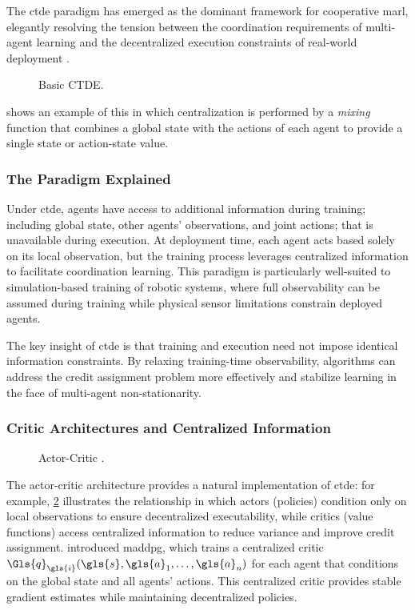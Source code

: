The \gls{ctde} paradigm has emerged as the dominant framework for cooperative \gls{marl}, 
elegantly resolving the tension between the coordination requirements of multi-agent 
learning and the decentralized execution constraints of real-world deployment 
\cite{lowe2020, foerster2018}.

\begin{figure}[!ht]
    \centering
    
    \caption{Basic CTDE.}
    \label{fig:basic_ctde}
\end{figure}
 shows an example of this in which centralization is
performed by a \emph{mixing} function that combines a global state with 
the actions of each agent to provide a single state or action-state value.

\subsubsection{The Paradigm Explained}

Under \gls{ctde}, agents have access to additional information during training;
including global state, other agents' observations, and joint actions;
that is unavailable during execution. At deployment time, 
each agent acts based solely on its local observation, 
but the training process leverages centralized information to 
facilitate coordination learning. This paradigm is particularly well-suited 
to simulation-based training of robotic systems, 
where full observability can be assumed during training while physical 
sensor limitations constrain deployed agents.

The key insight of \gls{ctde} is that training and execution need not 
impose identical information constraints. By relaxing training-time observability, 
algorithms can address the credit assignment problem more effectively and 
stabilize learning in the face of multi-agent non-stationarity.

\subsubsection{Critic Architectures and Centralized Information}

\begin{figure}
    \centering
    
    \caption{Actor-Critic .}
    \label{fig:ctde_actor-critic}
\end{figure}

The actor-critic architecture provides a natural implementation of \gls{ctde}: 
for example, \cref{fig:ctde_actor-critic} illustrates the relationship in which
actors (policies) condition only on local observations to ensure decentralized 
executability, while critics (value functions) access centralized information 
to reduce variance and improve credit assignment. 
\cite{lowe2020} introduced \gls{maddpg}, which trains a 
centralized critic \(\Gls{q}_{\gls{i}}(\gls{s}, \gls{a}_1, \ldots, \gls{a}_n)\) 
for each agent that conditions on the global state and all agents' actions. 
This centralized critic provides stable gradient estimates while 
maintaining decentralized policies.

